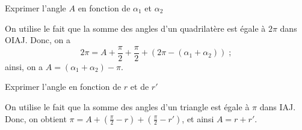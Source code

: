 	\begin{enonce}
		Exprimer l'angle $A$ en fonction de $\alpha_1$ et $\alpha_2$
	\end{enonce}
	
	
	\begin{corrige}
		On utilise le fait que la somme des angles d'un quadrilatère est égale à $2\pi$ dans OIAJ. Donc, on a 
		\[
		2\pi=A+\frac{\pi}{2}+\frac{\pi}{2}+(2\pi-(\alpha_1+\alpha_2))\;;
		\] 
		ainsi, on a $A=(\alpha_1+\alpha_2)-\pi$.
	\end{corrige}
	
	
	
	
	
	\begin{enonce}
		Exprimer l'angle \ptA en fonction de $r$ et de $r'$
	\end{enonce}
	
	
	\begin{corrige}
		On utilise le fait que la somme des angles d'un triangle est égale à $\pi$ dans IAJ. Donc, on obtient  $\pi=A+(\frac{\pi}{2}-r)+(\frac{\pi}{2}-r')$, et ainsi $A=r+r'$.
	\end{corrige}
	
	\finEntrainement
	
	\newpage
	
	
	

	
	
	

	
	
